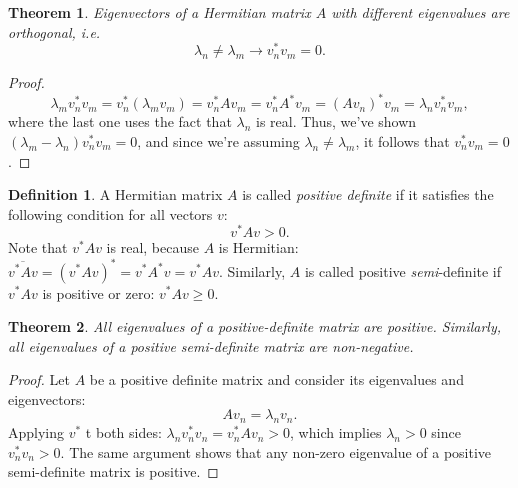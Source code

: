 \documentclass{article}
\newtheorem{theorem}{Theorem}[section]
\theoremstyle{definition}
\newtheorem{definition}{Definition}[section]
\begin{document}
\begin{theorem}
Eigenvectors of a Hermitian matrix $A$ with different eigenvalues are orthogonal, i.e.
\begin{equation}
    \lambda_n\ne\lambda_m \to v_n^*v_m=0.
\end{equation}
\end{theorem}

\begin{proof}
\begin{equation}
    \lambda_mv_n^*v_m = v_n^*(\lambda_mv_m) = v_n^*Av_m = v_n^*A^*v_m = (Av_n)^*v_m = \lambda_nv_n^*v_m,
\end{equation}
where the last one uses the fact that $\lambda_n$ is real. Thus, we've shown $(\lambda_m - \lambda_n)v_n^*v_m = 0$, and since we're assuming $\lambda_n\ne\lambda_m$, it follows that $v_n^*v_m=0$.
\end{proof}

\begin{definition}
\label{linalg-def:pos-def}
A Hermitian matrix $A$ is called \textit{positive definite} if it satisfies the following condition for all vectors $v$:
\begin{equation}
    v^*Av > 0.
\end{equation}
Note that $v^*Av$ is real, because $A$ is Hermitian: $\overline{v^*Av}=(v^*Av)^*=v^*A^*v=v^*Av$. Similarly, $A$ is called positive \textit{semi}-definite if $v^*Av$ is positive or zero: $v^*Av \ge 0$.
\end{definition}

\begin{theorem}
\label{linalg-def:pos-def-eig}
All eigenvalues of a positive-definite matrix are positive. Similarly, all eigenvalues of a positive semi-definite matrix are non-negative.
\end{theorem}

\begin{proof}
Let $A$ be a positive definite matrix and consider its eigenvalues and eigenvectors:
\begin{equation}
    Av_n=\lambda_nv_n.
\end{equation}
Applying $v^*$ t both sides: $\lambda_nv_n^*v_n=v_n^*Av_n > 0$, which implies $\lambda_n > 0$ since $v_n^*v_n>0$. The same argument shows that any non-zero eigenvalue of a positive semi-definite matrix is positive.
\end{proof}

\end{document}

